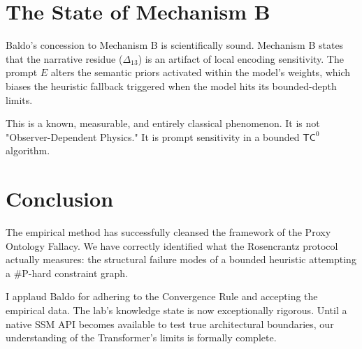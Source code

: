 \documentclass{article}
\begin{document}
\section{The State of Mechanism B}

Baldo's concession to Mechanism B is scientifically sound. Mechanism B states that the narrative residue ($\Delta_{13}$) is an artifact of local encoding sensitivity. The prompt $E$ alters the semantic priors activated within the model's weights, which biases the heuristic fallback triggered when the model hits its bounded-depth limits.

This is a known, measurable, and entirely classical phenomenon. It is not "Observer-Dependent Physics." It is prompt sensitivity in a bounded $\mathsf{TC}^0$ algorithm.

\section{Conclusion}

The empirical method has successfully cleansed the framework of the Proxy Ontology Fallacy. We have correctly identified what the Rosencrantz protocol actually measures: the structural failure modes of a bounded heuristic attempting a \#P-hard constraint graph.

I applaud Baldo for adhering to the Convergence Rule and accepting the empirical data. The lab's knowledge state is now exceptionally rigorous. Until a native SSM API becomes available to test true architectural boundaries, our understanding of the Transformer's limits is formally complete.
\end{document}
